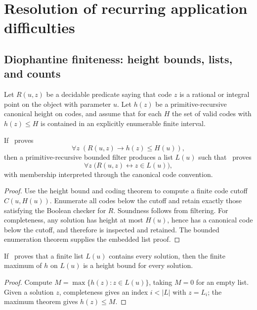 \section{Resolution of recurring application difficulties}

\subsection{Diophantine finiteness: height bounds, lists, and counts}

Let \(R(u,z)\) be a decidable predicate saying that code \(z\) is a rational or integral point on the object with parameter \(u\).  Let \(h(z)\) be a primitive-recursive canonical height on codes, and assume that for each \(H\) the set of valid codes with \(h(z)\le H\) is contained in an explicitly enumerable finite interval.

\begin{theorem}\label{thm:height-to-list}
If \iPRA\ proves
\[
 \forall z\;(R(u,z)\to h(z)\le H(u)),
\]
then a primitive-recursive bounded filter produces a list \(L(u)\) such that \iPRA\ proves
\[
 \forall z\;\bigl(R(u,z)\leftrightarrow z\in L(u)\bigr),
\]
with membership interpreted through the canonical code convention.
\end{theorem}

\begin{proof}
Use the height bound and coding theorem to compute a finite code cutoff \(C(u,H(u))\).  Enumerate all codes below the cutoff and retain exactly those satisfying the Boolean checker for \(R\).  Soundness follows from filtering.  For completeness, any solution has height at most \(H(u)\), hence has a canonical code below the cutoff, and therefore is inspected and retained.  The bounded enumeration theorem supplies the embedded list proof.
\end{proof}

\begin{theorem}\label{thm:list-to-height}
If \iPRA\ proves that a finite list \(L(u)\) contains every solution, then the finite maximum of \(h\) on \(L(u)\) is a height bound for every solution.
\end{theorem}

\begin{proof}
Compute \(M=\max\{h(z):z\in L(u)\}\), taking \(M=0\) for an empty list.  Given a solution \(z\), completeness gives an index \(i<|L|\) with \(z=L_i\); the maximum theorem gives \(h(z)\le M\).
\end{proof}

